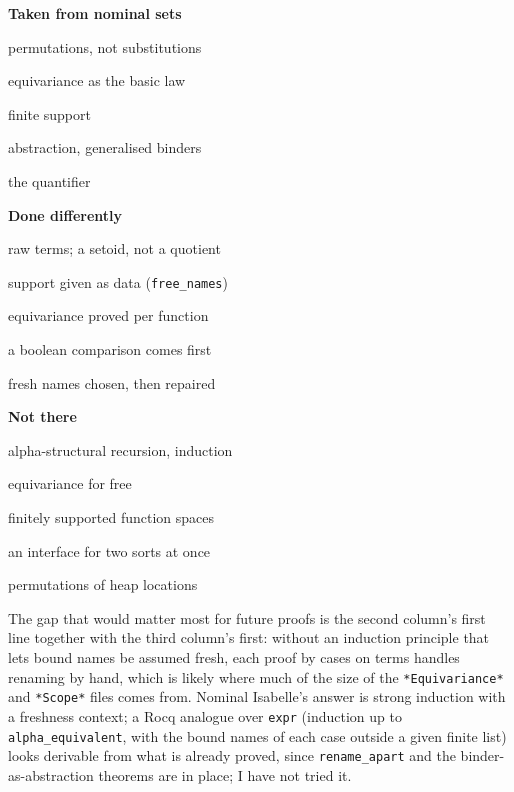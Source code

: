 \documentclass[10pt,a4paper]{article}
\newcommand\code[1]{\texttt{#1}}
\begin{document}
\begin{tcbraster}[raster columns=3,raster equal height,raster column skip=8pt,
  boxrule=0.6pt,arc=2.5pt,left=7pt,right=7pt,top=5pt,bottom=5pt,
  fontupper=\footnotesize,before skip=0.6em,after skip=0.8em]
\begin{tcolorbox}[colback=blueL,colframe=blue]
{\small\textbf{Taken from nominal sets}}\par\smallskip
permutations, not substitutions\par equivariance as the basic law\par
finite support\par abstraction, generalised binders\par
the  quantifier
\end{tcolorbox}
\begin{tcolorbox}[colback=amberL,colframe=amber]
{\small\textbf{Done differently}}\par\smallskip
raw terms; a setoid, not a quotient\par
support given as data (\code{free\_names})\par
equivariance proved per function\par
a boolean comparison comes first\par
fresh names chosen, then repaired
\end{tcolorbox}
\begin{tcolorbox}[colback=purpleL,colframe=purple]
{\small\textbf{Not there}}\par\smallskip
alpha-structural recursion, induction\par
equivariance for free\par
finitely supported function spaces\par
an interface for two sorts at once\par
permutations of heap locations
\end{tcolorbox}
\end{tcbraster}

The gap that would matter most for future proofs is the second column's first
line together with the third column's first: without an induction principle
that lets bound names be assumed fresh, each proof by cases on terms handles
renaming by hand, which is likely where much of the size of the
\code{*Equivariance*} and \code{*Scope*} files comes from. Nominal Isabelle's answer is strong induction
with a freshness context; a Rocq analogue over \code{expr} (induction up to
\code{alpha\_equivalent}, with the bound names of each case outside a given
finite list) looks derivable from what is already proved, since
\code{rename\_apart} and the binder-as-abstraction theorems are in place; I
have not tried it.
\end{document}
